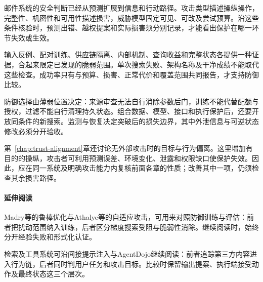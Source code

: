 邮件系统的安全判断已经从预测扩展到信息和行动路径。攻击类型描述操纵操作，完整性、机密性和可用性描述损害，威胁模型固定可见、可改及尝试预算。沿这些条件核验时，预测出错、越权提案和实际损害须分别记录，才能看出保护在哪一环节失效或生效。

输入反例、配对训练、供应链隔离、内部机制、查询收益和完整状态各提供一种证据，合起来限定已发现的脆弱范围。单次搜索失败、架构名称及干净成绩不能取代这些检查。成功率只有与预算、损害、正常代价和覆盖范围共同报告，才支持防御比较。

防御选择由薄弱位置决定：来源审查无法自行消除参数后门，训练不能代替配额与授权，过滤不能自行清理持久状态。组合数据、模型、接口和执行保护后，还要开放同条件的新搜索。监测与恢复决定突破后的损失边界，其中外泄信息与可逆状态修改必须分开验收。

第~\ref{chap:trust-alignment}章还讨论无外部攻击时的目标与行为偏离。这里增加有目的的操纵，攻击者可利用预测误差、环境变化、泄露和权限缺口使保护失效。因此，应在同一系统及明确攻击能力内复核前面各章的性质；改善其中一项，仍须检查其余损害路径。

\paragraph{延伸阅读}

Madry等的鲁棒优化与Athalye等的自适应攻击，可用来对照防御训练与评估：前者把扰动范围纳入训练，后者区分梯度搜索受阻与脆弱性消除。继续阅读时，始终分开经验失败和形式化认证。

检索及工具系统可沿间接提示注入与AgentDojo继续阅读：前者追踪第三方内容进入行为链，后者同时判用户任务和攻击目标。比较时保留输出提案、执行端接受动作及最终状态这三个层次。
